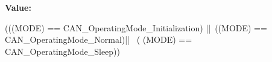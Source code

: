 \label{group__CAN__Operating__Mode_ga377f1598db9b0248ba83fa6e5a75db75}
{\bfseries Value:}
\begin{DoxyCode}
(((MODE) == CAN_OperatingMode_Initialization) ||\
                                    ((MODE) == CAN_OperatingMode_Normal)|| \
                                                                                                                                                (
      (MODE) == CAN_OperatingMode_Sleep))
\end{DoxyCode}
